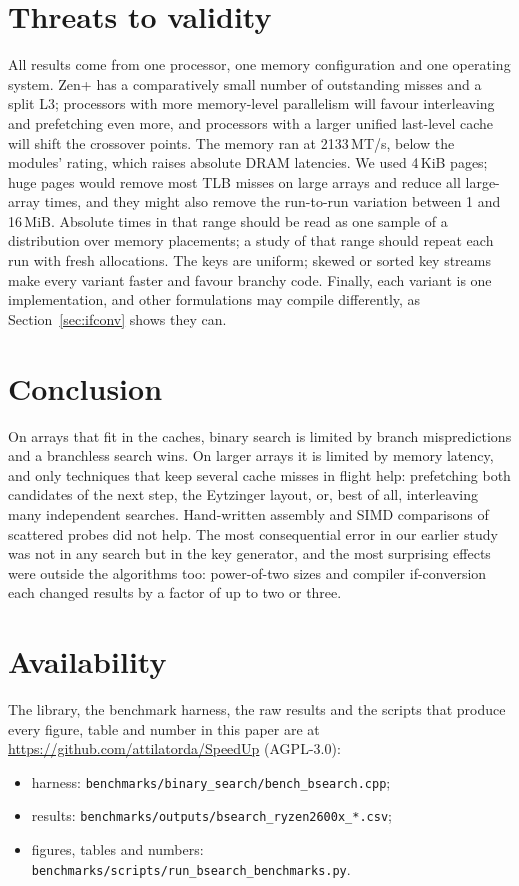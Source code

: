 \documentclass[11pt]{article}
\begin{document}
\section{Threats to validity}

All results come from one processor, one memory configuration and one operating
system. Zen+ has a comparatively small number of outstanding misses and a split
L3; processors with more memory-level parallelism will favour interleaving and
prefetching even more, and processors with a larger unified last-level cache
will shift the crossover points. The memory ran at 2133\,MT/s, below the
modules' rating, which raises absolute DRAM latencies. We used 4\,KiB pages;
huge pages would remove most TLB misses on large arrays and reduce all
large-array times, and they might also remove the run-to-run variation between
1 and 16\,MiB. Absolute times in that range should be read as one sample of a
distribution over memory placements; a study of that range should repeat each
run with fresh allocations. The keys are uniform; skewed or sorted key streams make every
variant faster and favour branchy code. Finally, each variant is one
implementation, and other formulations may compile differently, as
Section~\ref{sec:ifconv} shows they can.

\section{Conclusion}

On arrays that fit in the caches, binary search is limited by branch
mispredictions and a branchless search wins. On larger arrays it is limited by
memory latency, and only techniques that keep several cache misses in flight
help: prefetching both candidates of the next step, the Eytzinger layout, or,
best of all, interleaving many independent searches. Hand-written assembly and
SIMD comparisons of scattered probes did not help. The most consequential
error in our earlier study was not in any search but in the key generator, and
the most surprising effects were outside the algorithms too: power-of-two sizes
and compiler if-conversion each changed results by a factor of up to two or
three.

\section*{Availability}

The library, the benchmark harness, the raw results and the scripts that
produce every figure, table and number in this paper are at
\url{https://github.com/attilatorda/SpeedUp} (AGPL-3.0):
\begin{itemize}
\item harness: \nolinkurl{benchmarks/binary_search/bench_bsearch.cpp};
\item results: \nolinkurl{benchmarks/outputs/bsearch_ryzen2600x_*.csv};
\item figures, tables and numbers: \nolinkurl{benchmarks/scripts/run_bsearch_benchmarks.py}.
\end{itemize}



\end{document}
